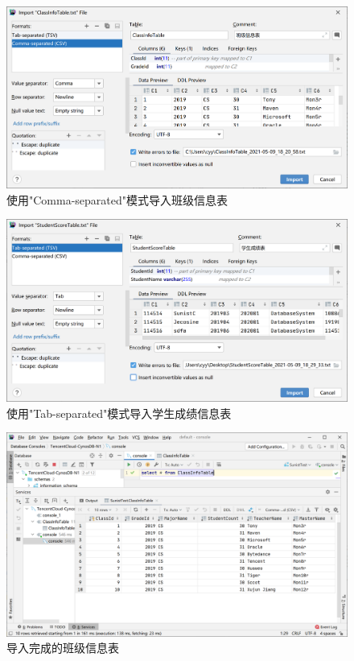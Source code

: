 \documentclass[a4paper,UTF8,heading=false,12pt]{article}
\begin{document}
\begin{figure}[htbp]
    \centering
    \includegraphics[width=15cm]{../Images/ClassInfoTable_OnImport.png}
    \caption{使用"Comma-separated"模式导入班级信息表}
\end{figure}

\begin{figure}[htbp]
    \centering
    \includegraphics[width=15cm]{../Images/StudentScoreTable_OnImport.png}
    \caption{使用"Tab-separated"模式导入学生成绩信息表}
\end{figure}

\begin{figure}[htbp]
    \centering
    \includegraphics[width=15cm]{../Images/ClassInfoTable_OnImported.png}
    \caption{导入完成的班级信息表}
\end{figure}
\end{document}
